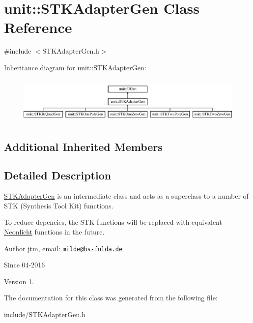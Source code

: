 \hypertarget{classunit_1_1STKAdapterGen}{}\section{unit\+:\+:S\+T\+K\+Adapter\+Gen Class Reference}
\label{classunit_1_1STKAdapterGen}


{\ttfamily \#include $<$S\+T\+K\+Adapter\+Gen.\+h$>$}

Inheritance diagram for unit\+:\+:S\+T\+K\+Adapter\+Gen\+:\begin{figure}[H]
\begin{center}
\leavevmode
\includegraphics[height=2.333333cm]{classunit_1_1STKAdapterGen}
\end{center}
\end{figure}
\subsection*{Additional Inherited Members}


\subsection{Detailed Description}
\hyperlink{classunit_1_1STKAdapterGen}{S\+T\+K\+Adapter\+Gen} is an intermediate class and acts as a superclass to a number of S\+TK (Synthesis Tool Kit) functions.

To reduce depencies, the S\+TK functions will be replaced with equivalent \hyperlink{classNeonlicht}{Neonlicht} functions in the future.

\begin{DoxyAuthor}{Author}
jtm, email\+:  \href{mailto:milde@hs-fulda.de}{\tt milde@hs-\/fulda.\+de} 
\end{DoxyAuthor}
\begin{DoxySince}{Since}
04-\/2016 
\end{DoxySince}
\begin{DoxyVersion}{Version}
1. 
\end{DoxyVersion}


The documentation for this class was generated from the following file\+:\begin{DoxyCompactItemize}
\item 
include/S\+T\+K\+Adapter\+Gen.\+h\end{DoxyCompactItemize}
